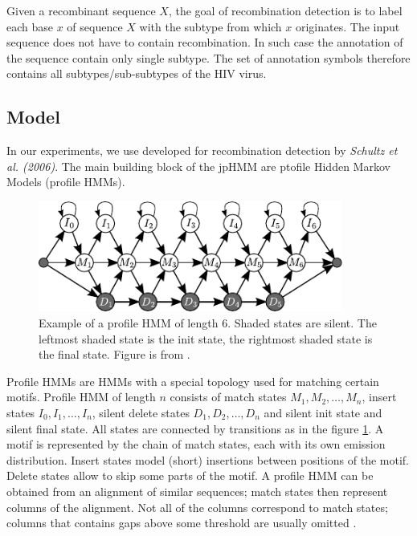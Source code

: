Given a recombinant sequence $X$, the goal of recombination detection is to
label each base $x$ of sequence $X$ with the subtype from which $x$ originates.
The input sequence does not have to contain recombination. In such case the
annotation of the sequence contain only single subtype. The set of annotation
symbols therefore contains all subtypes/sub-subtypes of the HIV virus. 

\subsection{Model}
\label{HERD:METHODS}
In our experiments, we use   developed for
recombination detection  by {\it Schultz et al. (2006)}. The main building
block of the jpHMM are ptofile Hidden Markov Models (profile HMMs).

\begin{figure}
\begin{center}
\includegraphics[width=10cm]{../figures/profile_hmm}
\end{center}
\caption[Profile HMM]{Example of a profile HMM of length $6$. Shaded states are
silent. The leftmost shaded state is the init state, the rightmost
shaded state is the final state. Figure is from \cite{Nanasi2010mgr}.}\label{FIGURE:PROFILEHMM}
\end{figure}

Profile HMMs are HMMs with a special topology used for matching certain
motifs\cite{Durbin1998}. Profile HMM of length $n$ consists of match states
$M_1,M_2,\dots, M_n$, insert states $I_0, I_1, \dots, I_n$, silent delete states
$D_1, D_2,\dots, D_n$ and silent init state and silent final state. All states are
connected by transitions as in the figure \ref{FIGURE:PROFILEHMM}. A motif is
represented by the chain of match states, each with its own emission distribution.
Insert states model (short) insertions between positions of the motif. Delete states allow to
skip some parts of the motif. A profile HMM can be obtained from an alignment of
similar sequences; match states then represent columns of the alignment.
Not all of the columns correspond to match states; columns that
contains gaps above some threshold are usually omitted \cite{Durbin1998}. 

